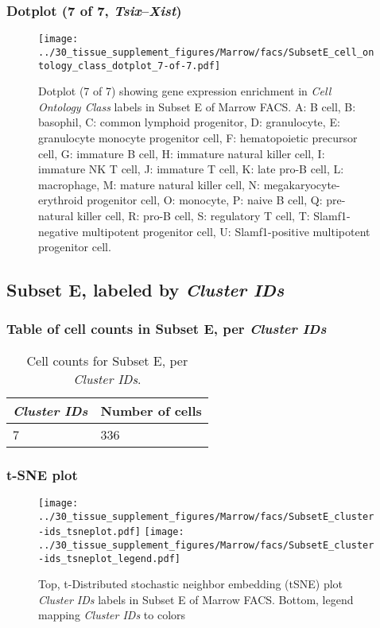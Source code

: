 \subsubsection{Dotplot (7 of 7, \emph{Tsix}--\emph{Xist})}
\begin{figure}[h]
\centering
\texttt{[image: ../30\_tissue\_supplement\_figures/Marrow/facs/SubsetE\_cell\_ontology\_class\_dotplot\_7-of-7.pdf]}

\caption{ Dotplot (7 of 7)  showing gene expression enrichment in \emph{Cell Ontology Class} labels in Subset E of Marrow FACS. A: B cell, B: basophil, C: common lymphoid progenitor, D: granulocyte, E: granulocyte monocyte progenitor cell, F: hematopoietic precursor cell, G: immature B cell, H: immature natural killer cell, I: immature NK T cell, J: immature T cell, K: late pro-B cell, L: macrophage, M: mature natural killer cell, N: megakaryocyte-erythroid progenitor cell, O: monocyte, P: naive B cell, Q: pre-natural killer cell, R: pro-B cell, S: regulatory T cell, T: Slamf1-negative multipotent progenitor cell, U: Slamf1-positive multipotent progenitor cell.}
\end{figure}


\clearpage

\subsection{Subset E, labeled by \emph{Cluster IDs}}
\subsubsection{Table of cell counts in Subset E, per \emph{Cluster IDs}}\begin{table}[h]
\centering
\label{my-label}
\begin{tabular}{@{}ll@{}}
\toprule

\emph{Cluster IDs}& Number of cells \\ \midrule
7 & 336 \\
\bottomrule
\end{tabular}
\caption{Cell counts for Subset E, per \emph{Cluster IDs}.}
\end{table}

\clearpage
\subsubsection{t-SNE plot}
\begin{figure}[h]
\centering
\texttt{[image: ../30\_tissue\_supplement\_figures/Marrow/facs/SubsetE\_cluster-ids\_tsneplot.pdf]}
\texttt{[image: ../30\_tissue\_supplement\_figures/Marrow/facs/SubsetE\_cluster-ids\_tsneplot\_legend.pdf]}
\caption{Top, t-Distributed stochastic neighbor embedding (tSNE) plot  \emph{Cluster IDs} labels in Subset E of Marrow FACS. Bottom, legend mapping \emph{Cluster IDs} to colors}
\end{figure}


